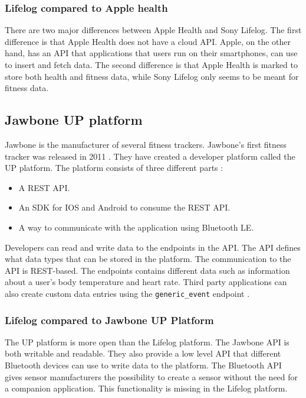 \documentclass{cslthse-msc}
\begin{document}
\subsubsection{Lifelog compared to Apple health} 

There are two major differences between Apple Health and Sony Lifelog. The first difference is that Apple Health does not have a cloud API. Apple, on the other hand, has an API that applications that users run on their smartphones, can use to insert and fetch data. The second difference is that Apple Health is marked to store both health and fitness data, while Sony Lifelog only seems to be meant for fitness data. 


\subsection{Jawbone UP platform}

Jawbone is the manufacturer of several fitness trackers. Jawbone's first fitness tracker was released in 2011 \cite{guo2013evaluation}. They have created a developer platform called the UP platform. The platform consists of three different parts \cite{JawboneDeveloper}:

\begin{itemize}
\item A REST API.
\item An SDK for IOS and Android to consume the REST API.
\item A way to communicate with the application using Bluetooth LE.
\end{itemize}

Developers can read and write data to the endpoints in the API. The API defines what data types that can be stored in the platform. The communication to the API is REST-based. The endpoints contains different data such as information about a user's body temperature and heart rate. Third party applications can also create custom data entries using the \verb!generic_event! endpoint \cite{JawboneCustomEndpoint}.


\subsubsection{Lifelog compared to Jawbone UP Platform}

The UP platform is more open than the Lifelog platform. The Jawbone API is both writable and readable. They also provide a low level API that different Bluetooth devices can use to write data to the platform. The Bluetooth API gives sensor manufacturers the possibility to create a sensor without the need for a companion application. This functionality is missing in the Lifelog platform.
\end{document}
